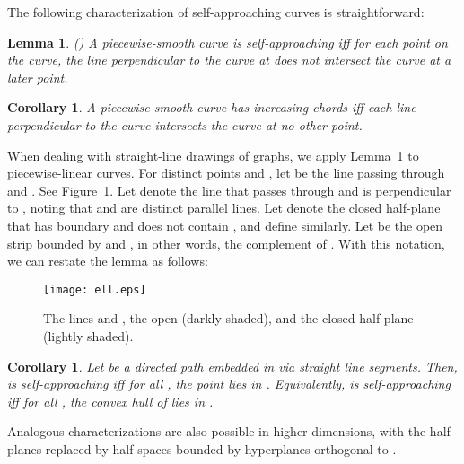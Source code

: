 \documentclass[11pt]{article}
\newtheorem{lemma}[theorem]{Lemma}
\newtheorem{corollary}[theorem]{Corollary}
\newcommand{\changed}[1]{#1}
\newcommand{\changeA}[1]{{#1}}
\begin{document}
The following characterization of self-approaching curves is straightforward:
\begin{lemma}(\cite{Icking:self-approachingcurves:1995})
\label{lem:perpendSA}
{\changed A piecewise-smooth curve is self-approaching iff for each point  on the curve, the line perpendicular to the curve at  does not intersect the curve at a later point.}
\end{lemma}



\begin{corollary}
\label{lem:perpendIC}
{\changed A piecewise-smooth curve has increasing chords iff each line perpendicular to the curve intersects the curve at no other point.}
\end{corollary}


When dealing with straight-line drawings of graphs, we apply Lemma~\ref{lem:perpendSA} to piecewise-linear curves.
\changeA{
For distinct points  and , let  be the line passing through  and .
See Figure~\ref{fig:ell}.
Let  denote the line that passes through  and is perpendicular to , noting that  and  are distinct parallel lines.
Let  denote the closed half-plane that has boundary  and does not contain , and define  similarly.
Let  be the open strip bounded by  and , in other words,
the complement of .
With this notation, we can restate the lemma as follows:}


\begin{figure}[htb]
\centering
\texttt{[image: ell.eps]}
\caption{
\changeA{The lines  and , the open  (darkly shaded), and the closed half-plane  (lightly shaded).}
}
\label{fig:ell}
\end{figure}

\begin{corollary}
\label{cor:edgeperpend}
Let  be a directed path embedded in  via straight line segments.  Then,  is self-approaching iff for all , the point  lies in .  Equivalently,  is self-approaching iff for all , the convex hull of  lies in .
\end{corollary}



Analogous characterizations are also possible in higher dimensions, with the half-planes  replaced by half-spaces bounded by hyperplanes orthogonal to .
\end{document}
